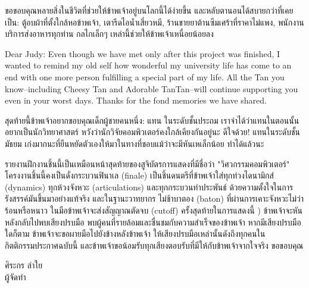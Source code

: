 ขอขอบคุณหลายสิ่งในชีวิตที่ช่วยให้ข้าพเจ้าอยู่บนโลกนี้ได้ง่ายขึ้น และหลับตานอนได้สบายกว่าที่เคยเป็น: ตู้อบผ้าที่ตั้งใกล้หอข้าพเจ้า, เตารีดไอน้ำเสี่ยวหมี, ร้านขายยาต้านซึมเศร้าที่ราคาไม่แพง, พนักงานบริการส่งอาหารทุกท่าน กลไกเล็กๆ เหล่านี้ช่วยให้ข้าพเจ้าเหนื่อยน้อยลง

Dear Judy: Even though we have met only after this project was finished, I wanted to remind my old self how wonderful my university life has come to an end with one more person fulfilling a special part of my life. All the Tan you know--including Cheesy Tan and Adorable TanTan--will continue supporting you even in your worst days. Thanks for the fond memories we have shared.

สุดท้ายนี้ข้าพเจ้าอยากขอบคุณเด็กผู้ชายคนหนึ่ง: แทน ในระดับชั้นประถม  เราจำได้ว่าแทนในตอนนั้นอยากเป็นนักวิทยาศาสตร์ หวังว่านักวิจัยคอมพิวเตอร์คงใกล้เคียงกันอยู่นะ ดีใจด้วย! แทนในระดับชั้นมัธยม เก่งมากนะที่ยืนหยัดตัวเองให้มาในทางที่ชอบแม้ว่าจะมีหันเหเล็กน้อย ทำได้แล้วนะ

รายงานฝึกงานชิ้นนี้เป็นเหมือนหน้าสุดท้ายของสูจิบัตรการแสดงที่มีชื่อว่า "วิศวกรรมคอมพิวเตอร์" โครงงานชิ้นนี้คงเป็นดั่งกระบวนฟินาเล (finale) เป็นชิ้นดนตรีที่ข้าพเจ้าใส่ทุกท่วงไดนามิกส์ (dynamics) ทุกห้วงจังหวะ (articulations) และทุกกระบวนท่าประพันธ์ ด้วยความตั้งใจในการรังสรรค์มันขึ้นมาอย่างแท้จริง และในฐานะวาทยากร ไม่ช้าบาตอง (baton) ที่ผ่านการเคาะจังหวะไม่ว่าร้อนหรือหนาว ในมือข้าพเจ้าจะส่งสัญญาณตัดจบ (cutoff) ครั้งสุดท้ายในการแสดงนี้ ) ข้าพเจ้าจะหันหลังกลับไปพบเสียงปรบมือ พบผู้คนที่รายล้อมและชื่นชมกับความสำเร็จของข้าพเจ้า หากมีเสียงปรบมือใดก็ตาม ข้าพเจ้าจะขอผายมือไปยังข้างหลังข้าพเจ้า ให้เสียงปรบมือเหล่านั้นดังถึงทุกคนในกิตติกรรมประกาศฉบับนี้ และข้าพเจ้าขอน้อมรับทุกเสียงตอบรับที่มีให้กับข้าพเจ้าจากใจจริง ขอขอบคุณ

\vskip 20pt

\hfill\begin{minipage}
    {\dimexpr 5cm}
    \begin{center}
        ศิระกร ลำใย\\
        ผู้จัดทำ
    \end{center}
    \xdef\tpd{\the\prevdepth}
\end{minipage}